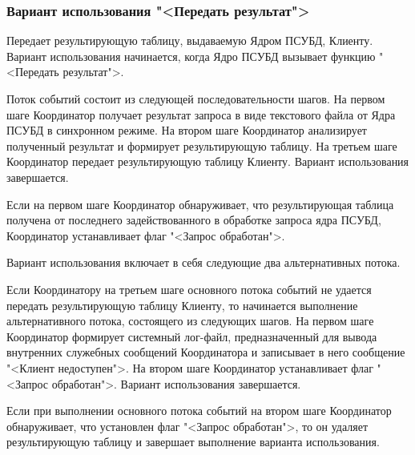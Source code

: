 \documentclass[11pt,oneside]{article}
\begin{document}
	\subsubsection{Вариант использования "<Передать результат">}
	\par Передает результирующую таблицу, выдаваемую Ядром ПСУБД, Клиенту. Вариант использования начинается, когда Ядро ПСУБД вызывает функцию "<Передать результат">.
	\par Поток событий состоит из следующей последовательности шагов. На первом шаге Координатор получает результат запроса в виде текстового файла от Ядра ПСУБД в синхронном режиме. На втором шаге Координатор анализирует полученный результат и формирует результирующую таблицу. На третьем шаге Координатор передает результирующую таблицу Клиенту. Вариант использования завершается.
	\par Если на первом шаге Координатор обнаруживает, что результирующая таблица получена от последнего задействованного в обработке запроса ядра ПСУБД, Координатор устанавливает флаг "<Запрос обработан">.
	\par Вариант использования включает в себя следующие два альтернативных потока.
	\par Если Координатору на третьем шаге основного потока событий не удается передать результирующую таблицу Клиенту, то начинается выполнение альтернативного потока, состоящего из следующих шагов. На первом шаге Координатор формирует системный лог-файл, предназначенный для вывода внутренних служебных сообщений Координатора и записывает в него сообщение "<Клиент недоступен">. На втором шаге Координатор устанавливает флаг "<Запрос обработан">. Вариант использования завершается.
	\par Если при выполнении основного потока событий на втором шаге Координатор обнаруживает, что установлен флаг "<Запрос обработан">, то он удаляет результирующую таблицу и завершает выполнение варианта использования.
	
\end{document}
